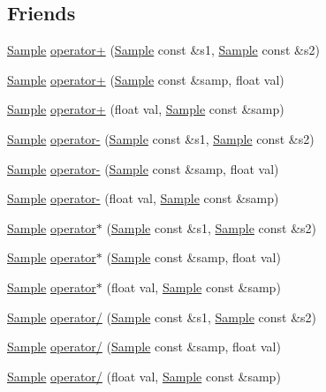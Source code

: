 \subsection*{Friends}
\begin{DoxyCompactItemize}
\item 
\hyperlink{classSignal_1_1Sample}{Sample} \hyperlink{classSignal_1_1Sample_a2fd9547bca678d483b7678ff2d19c7bf}{operator+} (\hyperlink{classSignal_1_1Sample}{Sample} const \&s1, \hyperlink{classSignal_1_1Sample}{Sample} const \&s2)
\item 
\hyperlink{classSignal_1_1Sample}{Sample} \hyperlink{classSignal_1_1Sample_a001ec49a9676fe37d9dfbb6f0b27127d}{operator+} (\hyperlink{classSignal_1_1Sample}{Sample} const \&samp, float val)
\item 
\hyperlink{classSignal_1_1Sample}{Sample} \hyperlink{classSignal_1_1Sample_a9a5ae50b9096d1c778d6a676b562e11a}{operator+} (float val, \hyperlink{classSignal_1_1Sample}{Sample} const \&samp)
\item 
\hyperlink{classSignal_1_1Sample}{Sample} \hyperlink{classSignal_1_1Sample_a4539e34cec889979677229c5ddf6eaf1}{operator-\/} (\hyperlink{classSignal_1_1Sample}{Sample} const \&s1, \hyperlink{classSignal_1_1Sample}{Sample} const \&s2)
\item 
\hyperlink{classSignal_1_1Sample}{Sample} \hyperlink{classSignal_1_1Sample_a30c04ca57e9f947cdd68041231676acc}{operator-\/} (\hyperlink{classSignal_1_1Sample}{Sample} const \&samp, float val)
\item 
\hyperlink{classSignal_1_1Sample}{Sample} \hyperlink{classSignal_1_1Sample_a27b97bc41eae03efe5f4157bdc3e42b2}{operator-\/} (float val, \hyperlink{classSignal_1_1Sample}{Sample} const \&samp)
\item 
\hyperlink{classSignal_1_1Sample}{Sample} \hyperlink{classSignal_1_1Sample_ae6e21a0672b773c8ae0537410c48a385}{operator$\ast$} (\hyperlink{classSignal_1_1Sample}{Sample} const \&s1, \hyperlink{classSignal_1_1Sample}{Sample} const \&s2)
\item 
\hyperlink{classSignal_1_1Sample}{Sample} \hyperlink{classSignal_1_1Sample_a6c56eccda9469f7283e67c6e89b05239}{operator$\ast$} (\hyperlink{classSignal_1_1Sample}{Sample} const \&samp, float val)
\item 
\hyperlink{classSignal_1_1Sample}{Sample} \hyperlink{classSignal_1_1Sample_afacc0c2623435bca02ee4049ed2db550}{operator$\ast$} (float val, \hyperlink{classSignal_1_1Sample}{Sample} const \&samp)
\item 
\hyperlink{classSignal_1_1Sample}{Sample} \hyperlink{classSignal_1_1Sample_a26dc248966f0cb3c5d1c52f7aa6643d4}{operator/} (\hyperlink{classSignal_1_1Sample}{Sample} const \&s1, \hyperlink{classSignal_1_1Sample}{Sample} const \&s2)
\item 
\hyperlink{classSignal_1_1Sample}{Sample} \hyperlink{classSignal_1_1Sample_a135d15a9237414aabce1df8f3a5ae77f}{operator/} (\hyperlink{classSignal_1_1Sample}{Sample} const \&samp, float val)
\item 
\hyperlink{classSignal_1_1Sample}{Sample} \hyperlink{classSignal_1_1Sample_a6178925f7213e13df7f4106cc0e22330}{operator/} (float val, \hyperlink{classSignal_1_1Sample}{Sample} const \&samp)
\end{DoxyCompactItemize}


